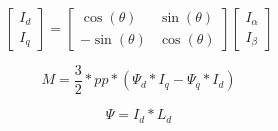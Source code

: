 \vspace{-0.8cm}
\blindtext{}

\vspace{0.3cm}

\begin{formel}
    \begin{equation}
        \label{eq:park}
        \begin{bmatrix}
            I_d \\
            I_q
        \end{bmatrix}
        =
        \begin{bmatrix}
            \cos(\theta)  &   \sin(\theta) \\
            -\sin(\theta) &   \cos(\theta)
        \end{bmatrix}
        \begin{bmatrix}
            I_\alpha \\
            I_\beta
        \end{bmatrix}
    \end{equation}
    \caption[Park-Transformation~\cite{MathWorksPark}]{}
\end{formel}

\vspace{-0.8cm}
\blindtext{}

\vspace{0.3cm}

\begin{formel}
    \begin{equation}
        \label{eq:Moment}
        M = \frac{3}{2} * pp * (\Psi_{d} * I_{q} - \Psi_{q} * I_{d})
    \end{equation}
    \caption[Drehmomentgleichung aus magnetischem Fluss~]{}
\end{formel}

\vspace{-1cm}

\begin{formel}
    \begin{equation}
        \label{eq:Psi-L}
        \Psi = I_d * L_d
    \end{equation}
    \caption[Zusammenhang magnetischer Fluss, Strom und Induktivität~]{}
\end{formel}

\vspace{-1cm}

